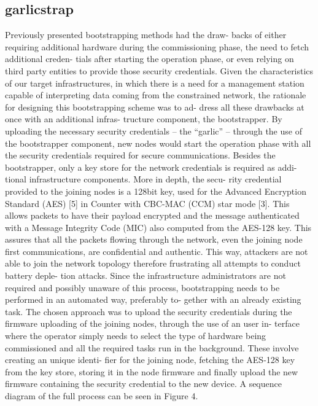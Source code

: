 \subsection{garlicstrap}
Previously presented bootstrapping methods had the draw-
backs of either requiring additional hardware during the
commissioning phase, the need to fetch additional creden-
tials after starting the operation phase, or even relying on
third party entities to provide those security credentials.
Given the characteristics of our target infrastructures, in
which there is a need for a management station capable of
interpreting data coming from the constrained network, the
rationale for designing this bootstrapping scheme was to ad-
dress all these drawbacks at once with an additional infras-
tructure component, the bootstrapper. By uploading the
necessary security credentials – the “garlic” – through the
use of the bootstrapper component, new nodes would start
the operation phase with all the security credentials required
for secure communications. Besides the bootstrapper, only
a key store for the network credentials is required as addi-
tional infrastructure components. More in depth, the secu-
rity credential provided to the joining nodes is a 128bit key,
used for the Advanced Encryption Standard (AES) [5] in
Counter with CBC-MAC (CCM) star mode [3]. This allows
packets to have their payload encrypted and the message
authenticated with a Message Integrity Code (MIC) also
computed from the AES-128 key. This assures that all the
packets flowing through the network, even the joining node
first communications, are confidential and authentic. This
way, attackers are not able to join the network topology
therefore frustrating all attempts to conduct battery deple-
tion attacks. Since the infrastructure administrators are not
required and possibly unaware of this process, bootstrapping
needs to be performed in an automated way, preferably to-
gether with an already existing task. The chosen approach
was to upload the security credentials during the firmware
uploading of the joining nodes, through the use of an user in-
terface where the operator simply needs to select the type of
hardware being commissioned and all the required tasks run
in the background. These involve creating an unique identi-
fier for the joining node, fetching the AES-128 key from the
key store, storing it in the node firmware and finally upload
the new firmware containing the security credential to the
new device. A sequence diagram of the full process can be
seen in Figure 4.

